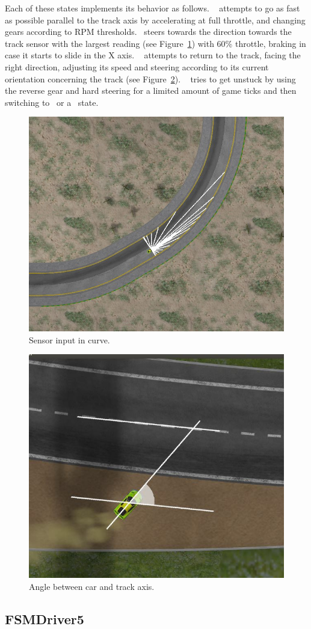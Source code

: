 Each of these states implements its behavior as follows. \SL~ attempts to go as fast as possible parallel to the track axis by accelerating at full throttle, and changing gears according to RPM thresholds. \C~steers towards the direction towards the track sensor with the largest reading (see Figure~\ref{Fig:FSensor}) with 60\% throttle, braking in case it starts to slide in the X axis. \OT~ attempts to return to the track, facing the right direction, adjusting its speed and steering according to its current orientation concerning the track (see Figure~\ref{Fig:Angle}). \St~ tries to get unstuck by using the reverse gear and hard steering for a limited amount of game ticks and then switching to \OT~or a \racing~state.

\begin{figure}[h]
	\centering
	\includegraphics[width=.45\textwidth]{img/FarthestSensor}
	\caption{Sensor input in curve.}
	\label{Fig:FSensor}
\end{figure}

\begin{figure}%
		\centering
		\includegraphics[width=.45\textwidth]{img/ReturnAngle}
		\caption{Angle between car and track axis.}
		\label{Fig:Angle}
\end{figure}

\subsection{FSMDriver5}

